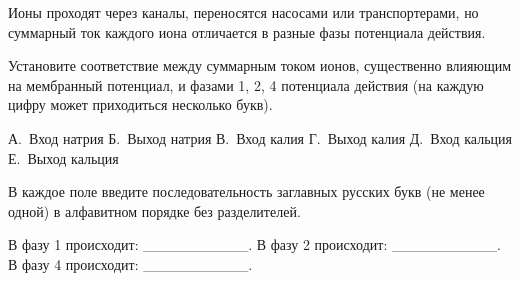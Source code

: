 
Ионы проходят через каналы, переносятся насосами или транспортерами, но суммарный ток каждого иона отличается в разные фазы потенциала действия.

Установите соответствие между суммарным током ионов, существенно влияющим на мембранный потенциал, и фазами 1, 2, 4 потенциала действия (на каждую цифру может приходиться несколько букв).



А. Вход натрия
Б. Выход натрия
В. Вход калия
Г. Выход калия
Д. Вход кальция
Е. Выход кальция

В каждое поле введите последовательность заглавных русских букв (не менее одной) в алфавитном порядке без разделителей.

В фазу 1 происходит: __________. В фазу 2 происходит: __________. В фазу 4 происходит: __________.